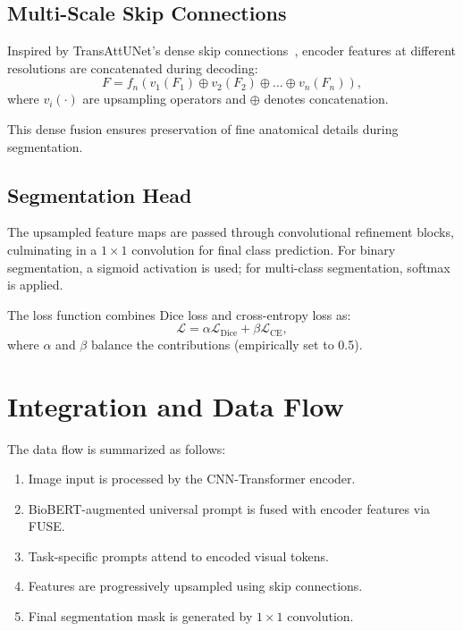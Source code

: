 \documentclass{cls/iutbscthesis}
\begin{document}
\subsection{Multi-Scale Skip Connections}

Inspired by TransAttUNet's dense skip connections~\cite{chen2024transattunet}, encoder features at different resolutions are concatenated during decoding:
\begin{equation}
    F = f_n(v_1(F_1) \oplus v_2(F_2) \oplus \ldots \oplus v_n(F_n)),
\end{equation}
where $v_i(\cdot)$ are upsampling operators and $\oplus$ denotes concatenation.

This dense fusion ensures preservation of fine anatomical details during segmentation.

\subsection{Segmentation Head}

The upsampled feature maps are passed through convolutional refinement blocks, culminating in a $1\times1$ convolution for final class prediction.
For binary segmentation, a sigmoid activation is used; for multi-class segmentation, softmax is applied.

The loss function combines Dice loss and cross-entropy loss as:
\begin{equation}
    \mathcal{L} = \alpha \mathcal{L}_{\text{Dice}} + \beta \mathcal{L}_{\text{CE}},
\end{equation}
where $\alpha$ and $\beta$ balance the contributions (empirically set to 0.5).

\section{Integration and Data Flow}

The data flow is summarized as follows:
\begin{enumerate}
    \item Image input is processed by the CNN-Transformer encoder.
    \item BioBERT-augmented universal prompt is fused with encoder features via FUSE.
    \item Task-specific prompts attend to encoded visual tokens.
    \item Features are progressively upsampled using skip connections.
    \item Final segmentation mask is generated by $1\times1$ convolution.
\end{enumerate}
\end{document}
